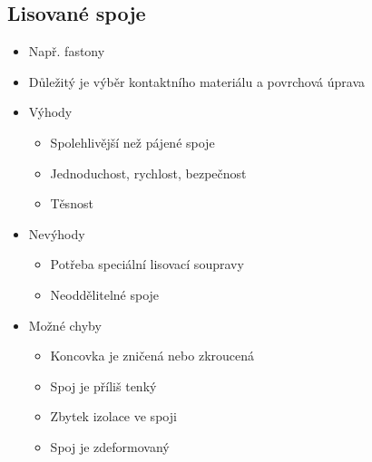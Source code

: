 \documentclass{article}
\begin{document}
\subsection{Lisované spoje}
\begin{itemize}
  \item Např. fastony
  \item Důležitý je výběr kontaktního materiálu a povrchová úprava
  \item Výhody
  \begin{itemize}
    \item Spolehlivější než pájené spoje
    \item Jednoduchost, rychlost, bezpečnost
    \item Těsnost
  \end{itemize}
  \item Nevýhody
  \begin{itemize}
    \item Potřeba speciální lisovací soupravy
    \item Neoddělitelné spoje
  \end{itemize}
  \item Možné chyby
  \begin{itemize}
    \item Koncovka je zničená nebo zkroucená
    \item Spoj je příliš tenký
    \item Zbytek izolace ve spoji
    \item Spoj je zdeformovaný
  \end{itemize}
\end{itemize}
\end{document}
